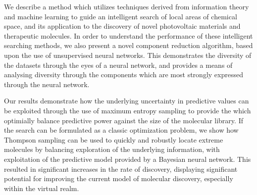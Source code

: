 We describe a method which utilizes techniques derived from information theory and machine learning to guide an intelligent search of local areas of chemical space, and its application to the discovery of novel photovoltaic materials and therapeutic molecules.  In order to understand the performance of these intelligent searching methods, we also present a novel component reduction algorithm, based upon the use of unsupervised neural networks.  This demonstrates the diversity of the datasets through the eyes of a neural network, and provides a means of analysing diversity through the components which are most strongly expressed through the neural network.  

Our results demonstrate how the underlying uncertainty in predictive values can be exploited through the use of maximum entropy sampling to provide the which optimially balance predictive power against the size of the molecular library. If the search can be formulated as a classic optimization problem, we show how Thompson sampling can be used to quickly and robustly locate extreme molecules by balancing exploration of the underlying information, with exploitation of the predictive model provided by a Bayesian neural network. This resulted in significant increases in the rate of discovery, displaying significant potential for improving the current model of molecular discovery, especially within the virtual realm.
